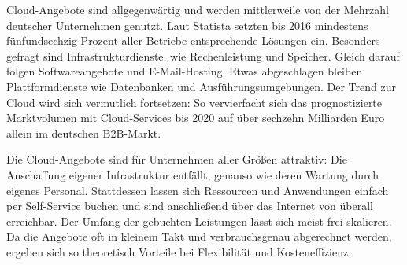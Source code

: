 
Cloud-Angebote sind allgegenwärtig und werden mittlerweile von der Mehrzahl deutscher Unternehmen genutzt. Laut Statista setzten bis 2016 mindestens fünfundsechzig Prozent aller Betriebe entsprechende Lösungen ein. 
Besonders gefragt sind Infrastrukturdienste, wie Rechenleistung und Speicher. Gleich darauf folgen Softwareangebote und E-Mail-Hosting. Etwas abgeschlagen bleiben Plattformdienste wie Datenbanken und Ausführungsumgebungen. %
Der Trend zur Cloud wird sich vermutlich fortsetzen: So vervierfacht sich das prognostizierte Marktvolumen mit Cloud-Services bis 2020 auf über sechzehn Milliarden Euro allein im deutschen B2B-Markt. %

Die Cloud-Angebote sind für Unternehmen aller Größen attraktiv: Die Anschaffung eigener Infrastruktur entfällt, genauso wie deren Wartung durch eigenes Personal. Stattdessen lassen sich Ressourcen und Anwendungen einfach per Self-Service buchen und sind anschließend über das Internet von überall erreichbar. Der Umfang der gebuchten Leistungen lässt sich meist frei skalieren. Da die Angebote oft in kleinem Takt und verbrauchsgenau abgerechnet werden, ergeben sich so theoretisch Vorteile bei Flexibilität und Kosteneffizienz.

